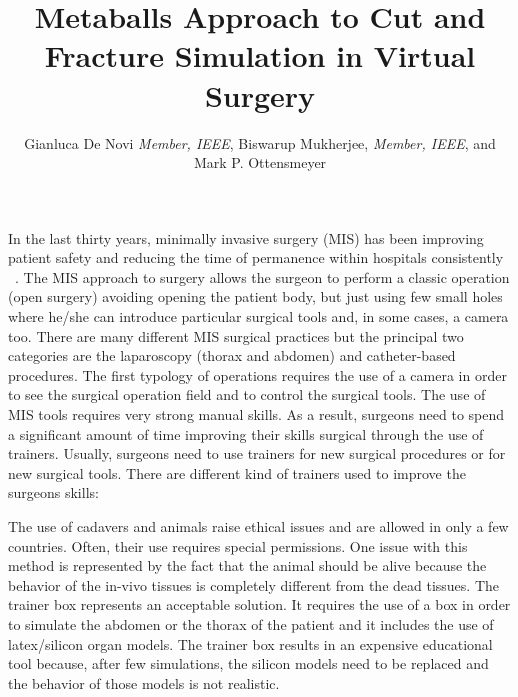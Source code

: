 \documentclass[journal]{vgtc}                %
\title{Metaballs Approach to Cut and Fracture Simulation in Virtual Surgery  }
\author{Gianluca De Novi \textit{Member, IEEE}, Biswarup Mukherjee, \textit{Member, IEEE}, and Mark P. Ottensmeyer}
\begin{document}


\maketitle

In the last thirty years, minimally invasive surgery (MIS) has been improving patient safety and reducing the time of permanence within hospitals consistently ~\cite{mishistory1}. 
The MIS approach to surgery allows the surgeon to perform a classic operation (open surgery) avoiding opening
the patient body, but just using few small holes where he/she can introduce particular
surgical tools and, in some cases, a camera too. There are many different MIS
surgical practices but the principal two categories are the laparoscopy (thorax and
abdomen) and catheter-based procedures. The first typology of operations requires
the use of a camera in order to see the surgical operation field and to control the
surgical tools. The use of MIS tools requires very strong manual skills. As a result,
surgeons need to spend a significant amount of time improving their skills surgical
through the use of trainers. Usually, surgeons need to use trainers for new surgical
procedures or for new surgical tools. There are different kind of trainers used to
improve the surgeons skills:  


The use of cadavers and animals raise ethical issues and are allowed in only a few
countries. Often, their use requires special permissions. One issue with this method
is represented by the fact that the animal should be alive because the behavior of the
in-vivo tissues is completely different from the dead tissues. The trainer box
represents an acceptable solution. It requires the use of a box in order to simulate the
abdomen or the thorax of the patient and it includes the use of latex/silicon organ
models. The trainer box results in an expensive educational tool because, after few
simulations, the silicon models need to be replaced and the behavior of those models
is not realistic.
\end{document}
